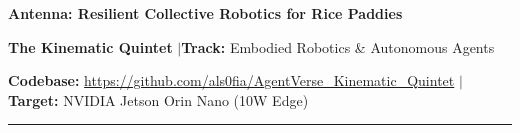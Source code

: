 \documentclass[9pt,a4paper]{article}
\begin{document}
\begin{center}
  {\Large \textbf{Antenna: Resilient Collective Robotics for Rice Paddies}}\par\vspace{0.5pt}
  {\normalsize \textbf{The Kinematic Quintet} \quad$\vert$\quad \textbf{Track:} Embodied Robotics \& Autonomous Agents}\par\vspace{0.5pt}
  {\footnotesize \textbf{Codebase:} \url{https://github.com/als0fia/AgentVerse_Kinematic_Quintet} \quad$\vert$\quad \textbf{Target:} NVIDIA Jetson Orin Nano (10W Edge)}\par\vspace{1pt}
  \hrule
\end{center}
\vspace{-2pt}
\end{document}
